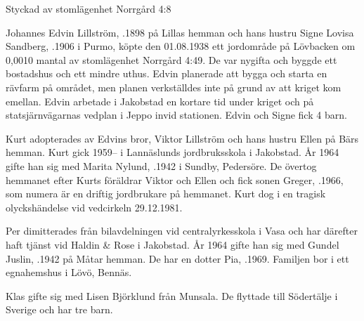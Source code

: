 
Styckad av stomlägenhet Norrgård 4:8

\jhvspace{}



Johannes Edvin Lillström, .1898 på Lillas hemman och hans hustru Signe Lovisa Sandberg, .1906 i Purmo, köpte den 01.08.1938 ett jordområde på Lövbacken om 0,0010 mantal av stomlägenhet Norrgård 4:49. De var nygifta och byggde ett bostadshus och ett mindre uthus. Edvin planerade att bygga och starta en rävfarm på området, men planen verkställdes inte på grund av att kriget kom emellan. Edvin arbetade i Jakobstad en kortare tid under kriget och på statsjärnvägarnas vedplan i Jeppo invid stationen. Edvin och Signe fick 4 barn.
\begin{jhchildren}
  \item {}
  \item {}
  \item {}
  \item {}
\end{jhchildren}

Kurt adopterades av Edvins bror, Viktor Lillström och hans hustru Ellen på Bärs hemman. Kurt gick 1959--	i Lannäslunds jordbruksskola i Jakobstad. År 1964 gifte han sig med Marita Nylund, .1942 i Sundby,	Pedersöre. De övertog hemmanet efter Kurts föräldrar Viktor och Ellen och fick sonen Greger, .1966, som numera är en driftig jordbrukare på hemmanet. Kurt dog i en tragisk olyckshändelse vid vedcirkeln 29.12.1981.

Per dimitterades från bilavdelningen vid centralyrkesskola i Vasa och har därefter haft tjänst vid Haldin \& Rose i Jakobstad. År 1964 gifte han sig med Gundel Juslin, .1942 på Måtar hemman. De har en dotter Pia, .1969. Familjen bor i ett egnahemshus i Lövö, Bennäs.

Klas gifte sig med Lisen Björklund från Munsala. De flyttade till Södertälje i Sverige och har tre barn.

